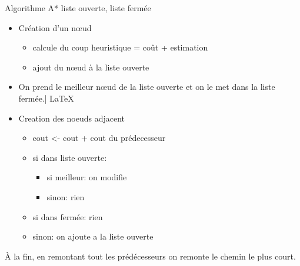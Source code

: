 \documentclass{beamer}
\begin{document}
  \begin{frame}{Algorithme A*}
      \hfill liste ouverte, liste fermée \\
      \begin{itemize}
        \item Création d'un nœud
        \begin{itemize}
          \item calcule du coup heuristique = coût + estimation
           \item ajout du nœud à la liste ouverte
         \end{itemize}
        \item On prend le meilleur nœud de la liste ouverte et on le met dans
          la liste fermée.| LaTeX
        \item Creation des noeuds adjacent
          \begin{itemize}
            \item cout <- cout + cout du prédecesseur
            \item si dans liste ouverte:
            \begin{itemize}
              \item si meilleur: on modifie
              \item sinon: rien
            \end{itemize}
            \item si dans fermée: rien
            \item sinon: on ajoute a la liste ouverte
          \end{itemize}
    \end{itemize}
    
    À la fin, en remontant tout les prédécesseurs on remonte le chemin le plus
    court.
      
  \end{frame}
\end{document}
